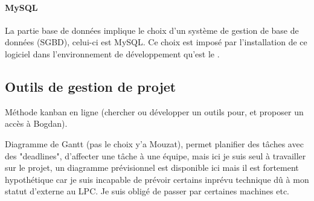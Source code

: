		\paragraph{MySQL}
La partie base de données implique le choix d'un système de gestion de base de données (SGBD), celui-ci est MySQL. Ce choix est imposé par l'installation de ce logiciel dans l'environnement de développement qu'est le \CC{}.


	\subsection{Outils de gestion de projet}

Méthode kanban en ligne (chercher ou développer un outils pour, et proposer un accès à Bogdan).

Diagramme de Gantt (pas le choix y'a Mouzat), permet planifier des tâches avec des "deadlines", d'affecter une tâche à une équipe, mais ici je suis seul à travailler sur le projet, un diagramme prévisionnel est disponible ici mais il est fortement hypothétique car je suis incapable de prévoir certains inprévu technique dû à mon statut d'externe au LPC. Je suis obligé de passer par certaines machines etc.

